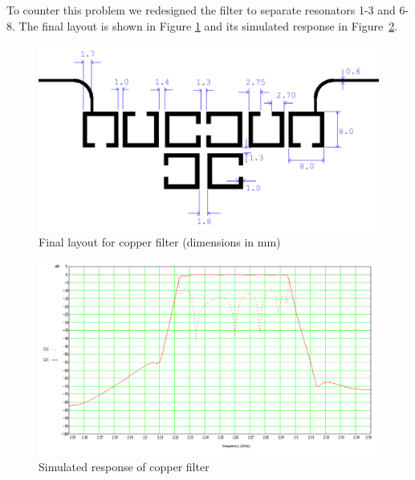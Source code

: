To counter this problem we redesigned the filter to separate resonators 1-3 and 6-8. The final layout is shown in Figure \ref{figure:design-copper-layout} and its simulated response in Figure~\ref{figure:design-copper-response}.


\begin{figure}[ht]
\begin{center}
\includegraphics[scale=0.4]{fig/design-copper-layout.pdf}
\end{center}
\caption{ Final layout for copper filter (dimensions in mm)}
\label{figure:design-copper-layout}
\end{figure}

\begin{figure}[ht]
\hspace{-4em}
\includegraphics[scale=0.4]{fig/design-copper-simulated.pdf}
\caption{Simulated response of copper filter}
\label{figure:design-copper-response}
\end{figure}

